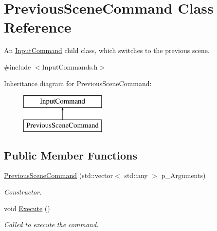 \hypertarget{class_previous_scene_command}{}\section{Previous\+Scene\+Command Class Reference}
\label{class_previous_scene_command}


An \mbox{\hyperlink{class_input_command}{Input\+Command}} child class, which switches to the previous scene.  




{\ttfamily \#include $<$Input\+Commands.\+h$>$}

Inheritance diagram for Previous\+Scene\+Command\+:\begin{figure}[H]
\begin{center}
\leavevmode
\includegraphics[height=2.000000cm]{class_previous_scene_command}
\end{center}
\end{figure}
\subsection*{Public Member Functions}
\begin{DoxyCompactItemize}
\item 
\mbox{\hyperlink{class_previous_scene_command_a1a10301714fec1628347d627dff2e9f9}{Previous\+Scene\+Command}} (std\+::vector$<$ std\+::any $>$ p\+\_\+\+Arguments)
\begin{DoxyCompactList}\small\item\em Constructor. \end{DoxyCompactList}\item 
\mbox{\label{class_previous_scene_command_a9250a9557f74e90c92ff62363c47b1ab}} 
void \mbox{\hyperlink{class_previous_scene_command_a9250a9557f74e90c92ff62363c47b1ab}{Execute}} ()
\begin{DoxyCompactList}\small\item\em Called to execute the command. \end{DoxyCompactList}\end{DoxyCompactItemize}
